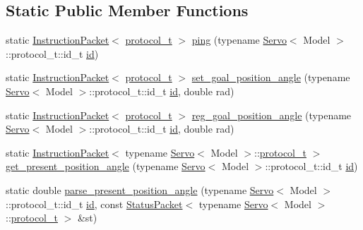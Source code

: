 \subsection*{Static Public Member Functions}
\begin{DoxyCompactItemize}
\item 
static \hyperlink{classdynamixel_1_1_instruction_packet}{Instruction\+Packet}$<$ \hyperlink{classdynamixel_1_1servos_1_1_servo_a7718c41cee1187b992836f4b6bad8a38}{protocol\+\_\+t} $>$ \hyperlink{classdynamixel_1_1servos_1_1_servo_aff70a01c90eddfca6070c0b97237ee60}{ping} (typename \hyperlink{classdynamixel_1_1servos_1_1_servo}{Servo}$<$ Model $>$\+::protocol\+\_\+t\+::id\+\_\+t \hyperlink{classdynamixel_1_1servos_1_1_servo_a2d022081672e25a7bb57b76706e1cc57}{id})
\item 
static \hyperlink{classdynamixel_1_1_instruction_packet}{Instruction\+Packet}$<$ \hyperlink{classdynamixel_1_1servos_1_1_servo_a7718c41cee1187b992836f4b6bad8a38}{protocol\+\_\+t} $>$ \hyperlink{classdynamixel_1_1servos_1_1_servo_aac6fe4f59bd30af81b8f8ecfc11caf9d}{set\+\_\+goal\+\_\+position\+\_\+angle} (typename \hyperlink{classdynamixel_1_1servos_1_1_servo}{Servo}$<$ Model $>$\+::protocol\+\_\+t\+::id\+\_\+t \hyperlink{classdynamixel_1_1servos_1_1_servo_a2d022081672e25a7bb57b76706e1cc57}{id}, double rad)
\item 
static \hyperlink{classdynamixel_1_1_instruction_packet}{Instruction\+Packet}$<$ \hyperlink{classdynamixel_1_1servos_1_1_servo_a7718c41cee1187b992836f4b6bad8a38}{protocol\+\_\+t} $>$ \hyperlink{classdynamixel_1_1servos_1_1_servo_ae500d1911ed8bf356b54b6d8d288a316}{reg\+\_\+goal\+\_\+position\+\_\+angle} (typename \hyperlink{classdynamixel_1_1servos_1_1_servo}{Servo}$<$ Model $>$\+::protocol\+\_\+t\+::id\+\_\+t \hyperlink{classdynamixel_1_1servos_1_1_servo_a2d022081672e25a7bb57b76706e1cc57}{id}, double rad)
\item 
static \hyperlink{classdynamixel_1_1_instruction_packet}{Instruction\+Packet}$<$ typename \hyperlink{classdynamixel_1_1servos_1_1_servo}{Servo}$<$ Model $>$\+::\hyperlink{classdynamixel_1_1servos_1_1_servo_a7718c41cee1187b992836f4b6bad8a38}{protocol\+\_\+t} $>$ \hyperlink{classdynamixel_1_1servos_1_1_servo_a164c57e41b366c35c8d1f9d4487415b7}{get\+\_\+present\+\_\+position\+\_\+angle} (typename \hyperlink{classdynamixel_1_1servos_1_1_servo}{Servo}$<$ Model $>$\+::protocol\+\_\+t\+::id\+\_\+t \hyperlink{classdynamixel_1_1servos_1_1_servo_a2d022081672e25a7bb57b76706e1cc57}{id})
\item 
static double \hyperlink{classdynamixel_1_1servos_1_1_servo_a8c4ff59fc0ea86b7b5c6e5733199357f}{parse\+\_\+present\+\_\+position\+\_\+angle} (typename \hyperlink{classdynamixel_1_1servos_1_1_servo}{Servo}$<$ Model $>$\+::protocol\+\_\+t\+::id\+\_\+t \hyperlink{classdynamixel_1_1servos_1_1_servo_a2d022081672e25a7bb57b76706e1cc57}{id}, const \hyperlink{classdynamixel_1_1_status_packet}{Status\+Packet}$<$ typename \hyperlink{classdynamixel_1_1servos_1_1_servo}{Servo}$<$ Model $>$\+::\hyperlink{classdynamixel_1_1servos_1_1_servo_a7718c41cee1187b992836f4b6bad8a38}{protocol\+\_\+t} $>$ \&st)

\end{DoxyCompactItemize}
